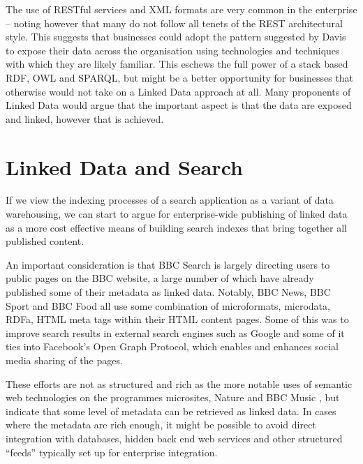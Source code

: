 The use of RESTful services and XML formats are very common in
the enterprise -- noting however that many do not follow all tenets
of the REST architectural style. This suggests that businesses
could adopt the pattern suggested by Davis to expose their
data across the organisation using technologies and techniques
with which they are likely familiar. This eschews the full power
of a stack based RDF, OWL and SPARQL, but might be a better
opportunity for businesses that otherwise would not take on a
Linked Data approach at all.  Many proponents of Linked Data would
argue that the important aspect is that the data are exposed and
linked, however that is achieved.

\section{Linked Data and Search}

If we view the indexing processes
of a search application as a variant of data warehousing,
we can start to argue for enterprise-wide publishing of
linked data as a more cost effective means of building search
indexes that bring together all published content.

An important consideration is that BBC Search is largely directing
users to public pages on the BBC website, a large number of which have
already published some of their metadata as linked data. Notably, BBC News,
BBC Sport and BBC Food all use some combination
of microformats, microdata, RDFa, HTML meta tags within their HTML content
pages. Some of this was to improve search results in external search engines
such as Google and some of it ties into Facebook's Open Graph Protocol, which
enables and enhances social media sharing of the pages.

These efforts are not as structured and rich as the more notable uses
of semantic web technologies on the programmes microsites, Nature and BBC
Music \cite{raimond2010use}, but indicate that some level of metadata
can be retrieved
as linked data. In cases where the metadata are rich enough, it might be
possible to avoid direct integration with databases, hidden back end
web services and other structured ``feeds'' typically set up for enterprise
integration.

